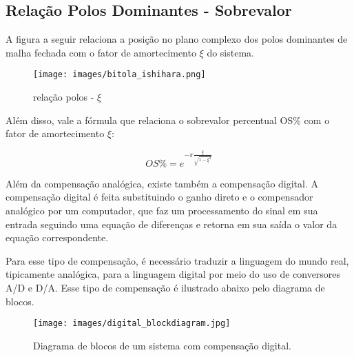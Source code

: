 \subsection{Relação Polos Dominantes - Sobrevalor}
 A figura a seguir relaciona a posição no plano complexo dos polos dominantes de malha fechada com o fator de amortecimento $\xi$ do sistema.

\begin{figure}[H]
\centering
\texttt{[image: images/bitola\_ishihara.png]}
\caption{relação polos - $\xi$}
\label{fig:bitola}
\end{figure}

Além disso, vale a fórmula que relaciona o sobrevalor percentual OS\% com o fator de amortecimento $\xi$:

\begin{equation}
   OS\% = e^{- \pi \frac{\xi}{\sqrt{1 - \xi ^2}}}
\end{equation}


    Além da compensação analógica, existe também a compensação digital. A compensação digital é feita substituindo o ganho direto e o compensador analógico por um computador, que faz um processamento do sinal em sua entrada seguindo uma equação de diferenças e retorna em sua saída o valor da equação correspondente.

    Para esse tipo de compensação, é necessário traduzir a linguagem do mundo real, tipicamente analógica, para a linguagem digital por meio do uso de conversores A/D e D/A. Esse tipo de compensação é ilustrado abaixo pelo diagrama de blocos.

\begin{figure}[H]
\centering
\texttt{[image: images/digital\_blockdiagram.jpg]}
\caption{Diagrama de blocos de um sistema com compensação digital.}
\label{fig:digital_blocks}
\end{figure}

